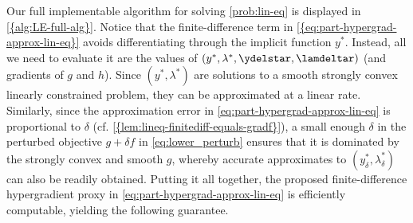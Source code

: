 Our full implementable algorithm for solving \cref{prob:lin-eq} is displayed in \cref{{alg:LE-full-alg}}.
Notice that the finite-difference term in \cref{{eq:part-hypergrad-approx-lin-eq}} avoids differentiating through the implicit function $y^*$. Instead, all we need to evaluate it are the values of $(y^*,\lambda^*,\ydelstar,\lamdeltar)$ (and gradients of $g$ and $h$). Since $(y^*,\lambda^*)$ are solutions to a smooth strongly convex linearly constrained  problem, they can be approximated
at a linear rate. Similarly, since the approximation error in \cref{eq:part-hypergrad-approx-lin-eq}  is proportional to $\delta$ (cf. \cref{{lem:lineq-finitediff-equals-gradf}}), a  small enough $\delta$ in the perturbed objective $ g+\delta f$ in \cref{eq:lower_perturb} ensures that it is dominated by the strongly convex and smooth $g$, whereby accurate approximates to $(y_\delta^*,\lambda_\delta^*)$ can also be readily obtained. Putting it all together, the proposed finite-difference hypergradient proxy in \cref{eq:part-hypergrad-approx-lin-eq} is  efficiently computable, yielding the following guarantee. 



